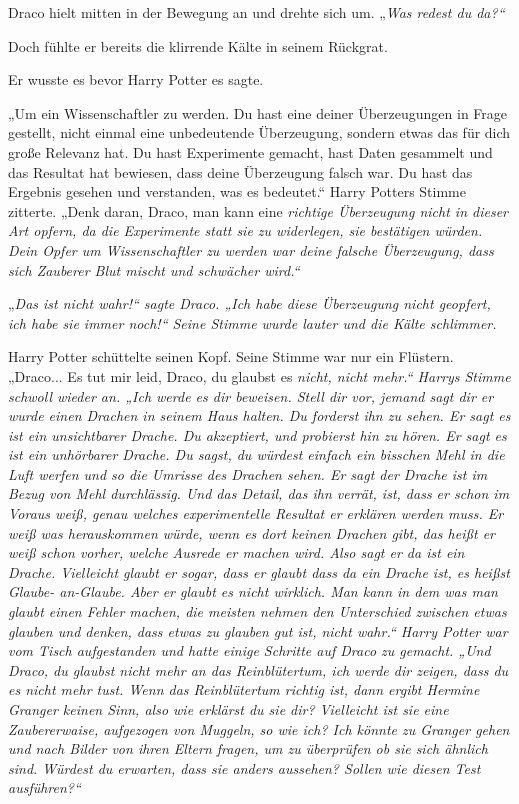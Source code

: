 {Draco hielt mitten in der Bewegung an und drehte sich um. „\emph{Was redest du da?“}

Doch fühlte er bereits die klirrende Kälte in seinem Rückgrat.

Er wusste es bevor Harry Potter es sagte.

„Um ein Wissenschaftler zu werden. Du hast eine deiner Überzeugungen in Frage gestellt, nicht einmal eine unbedeutende Überzeugung, sondern etwas das für dich große Relevanz hat. Du hast Experimente gemacht, hast Daten gesammelt und das Resultat hat bewiesen, dass deine Überzeugung falsch war. Du hast das Ergebnis gesehen und verstanden, was es bedeutet.“ Harry Potters Stimme zitterte. „Denk daran, Draco, man kann eine \emph{richtige Überzeugung nicht in dieser Art opfern, da die Experimente statt sie zu widerlegen, sie bestätigen würden. Dein Opfer um Wissenschaftler zu werden war deine \emph{falsche} Überzeugung, dass sich Zauberer Blut mischt und schwächer wird.“}

„\emph{Das ist nicht wahr!“ sagte Draco. „Ich habe diese Überzeugung nicht geopfert, ich habe sie immer noch!“ Seine Stimme wurde lauter und die Kälte schlimmer.}

Harry Potter schüttelte seinen Kopf. Seine Stimme war nur ein Flüstern. „Draco... Es tut mir leid, Draco, du glaubst es \emph{nicht, nicht mehr.“ Harrys Stimme schwoll wieder an. „Ich werde es dir beweisen. Stell dir vor, jemand sagt dir er wurde einen Drachen in seinem Haus halten. Du forderst ihn zu sehen. Er sagt es ist ein unsichtbarer Drache. Du akzeptiert, und probierst hin zu hören. Er sagt es ist ein unhörbarer Drache. Du sagst, du würdest einfach ein bisschen Mehl in die Luft werfen und so die Umrisse des Drachen sehen. Er sagt der Drache ist im Bezug von Mehl durchlässig. Und das Detail, das ihn verrät, ist, dass er schon im Voraus weiß, genau welches experimentelle Resultat er erklären werden muss. Er weiß was herauskommen würde, wenn es dort keinen Drachen gibt, das heißt er weiß schon vorher, welche Ausrede er machen wird. Also sagt er da ist ein Drache. Vielleicht glaubt er sogar, dass er glaubt dass da ein Drache ist, es heißst Glaube- an-Glaube. Aber er glaubt es nicht wirklich. Man kann in dem was man glaubt einen Fehler machen, die meisten nehmen den Unterschied zwischen etwas glauben und denken, dass etwas zu glauben gut ist, nicht wahr.“ Harry Potter war vom Tisch aufgestanden und hatte einige Schritte auf Draco zu gemacht. „Und Draco, du glaubst nicht mehr an das Reinblütertum, ich werde dir zeigen, dass du es nicht mehr tust. Wenn das Reinblütertum richtig ist, dann ergibt Hermine Granger keinen Sinn, also wie erklärst du sie dir? Vielleicht ist sie eine Zaubererwaise, aufgezogen von Muggeln, so wie ich? Ich könnte zu Granger gehen und nach Bilder von ihren Eltern fragen, um zu überprüfen ob sie sich ähnlich sind. Würdest du erwarten, dass sie anders aussehen? Sollen wie diesen Test ausführen?“}

}
